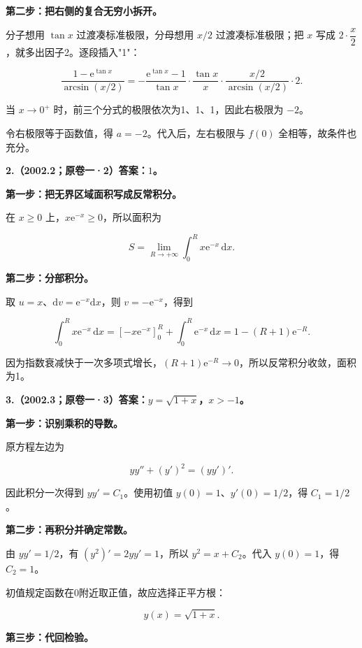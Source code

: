 \documentclass[UTF8,11pt,fontset=windows]{ctexart}
\begin{document}
\textbf{第二步：把右侧的复合无穷小拆开。}

分子想用 $\tan x$ 过渡凑标准极限，分母想用 $x/2$ 过渡凑标准极限；把 $x$ 写成 $2\cdot\dfrac x2$，就多出因子2。逐段插入"1"：

$$
\frac{1-\mathrm e^{\tan x}}{\arcsin(x/2)}
=-\frac{\mathrm e^{\tan x}-1}{\tan x}
\cdot\frac{\tan x}{x}
\cdot\frac{x/2}{\arcsin(x/2)}\cdot2.
$$

当 $x\to0^+$ 时，前三个分式的极限依次为1、1、1，因此右极限为 $-2$。

令右极限等于函数值，得 $a=-2$。代入后，左右极限与 $f(0)$ 全相等，故条件也充分。

\clearpage

\textbf{2.（2002.2；原卷一·2）答案：$1$。}

\textbf{第一步：把无界区域面积写成反常积分。}

在 $x\ge0$ 上，$x\mathrm e^{-x}\ge0$，所以面积为

$$
S=\lim_{R\to+\infty}\int_0^R x\mathrm e^{-x}\,\mathrm dx.
$$

\textbf{第二步：分部积分。}

取 $u=x$、$\mathrm dv=\mathrm e^{-x}\mathrm dx$，则 $v=-\mathrm e^{-x}$，得到

$$
\int_0^R x\mathrm e^{-x}\,\mathrm dx
=[-x\mathrm e^{-x}]_0^R+\int_0^R\mathrm e^{-x}\,\mathrm dx
=1-(R+1)\mathrm e^{-R}.
$$

因为指数衰减快于一次多项式增长，$(R+1)\mathrm e^{-R}\to0$，所以反常积分收敛，面积为1。

\clearpage

\textbf{3.（2002.3；原卷一·3）答案：$y=\sqrt{1+x}$，$x>-1$。}

\textbf{第一步：识别乘积的导数。}

原方程左边为

$$
yy''+(y')^2=(yy')'.
$$

因此积分一次得到 $yy'=C_1$。使用初值 $y(0)=1$、$y'(0)=1/2$，得 $C_1=1/2$。

\textbf{第二步：再积分并确定常数。}

由 $yy'=1/2$，有 $(y^2)'=2yy'=1$，所以 $y^2=x+C_2$。代入 $y(0)=1$，得 $C_2=1$。

初值规定函数在0附近取正值，故应选择正平方根：

$$
y(x)=\sqrt{1+x}.
$$

\textbf{第三步：代回检验。}
\end{document}
